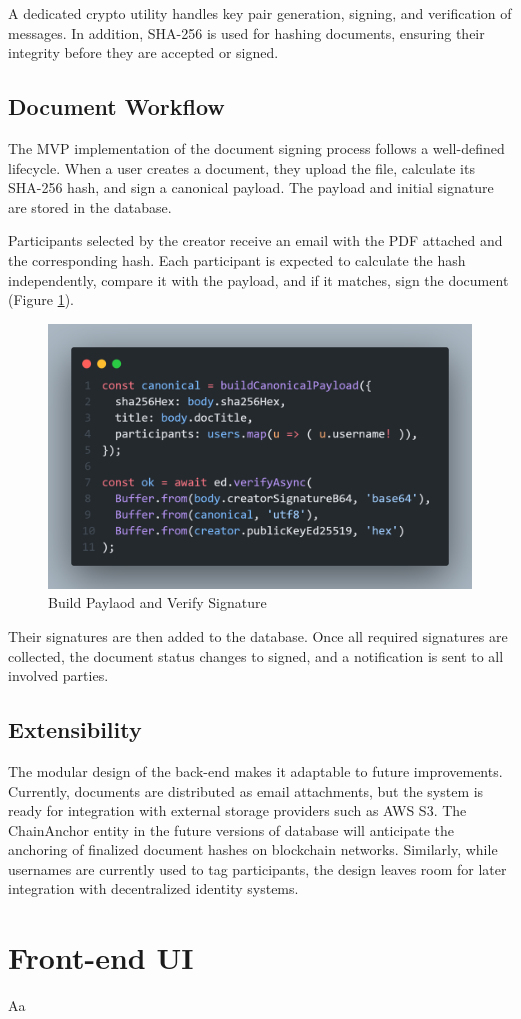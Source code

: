 A dedicated crypto utility handles key pair generation, signing, and verification of messages. In addition, SHA-256 is used for hashing documents, ensuring their integrity before they are accepted or signed.

\subsection{Document Workflow}
The MVP implementation of the document signing process follows a well-defined lifecycle. When a user creates a document, they upload the file, calculate its SHA-256 hash, and sign a canonical payload. The payload and initial signature are stored in the database.

Participants selected by the creator receive an email with the PDF attached and the corresponding hash. Each participant is expected to calculate the hash independently, compare it with the payload, and if it matches, sign the document (Figure \ref{payload-signature}). 

\begin{figure}[H]
    \centering
    \includegraphics[width=18cm]{"images/payload-signature.png"}
    \caption{Build Paylaod and Verify Signature}
    \label{payload-signature}
\end{figure}

Their signatures are then added to the database. Once all required signatures are collected, the document status changes to signed, and a notification is sent to all involved parties.

\subsection{Extensibility}
The modular design of the back-end makes it adaptable to future improvements. Currently, documents are distributed as email attachments, but the system is ready for integration with external storage providers such as AWS S3. The ChainAnchor entity in the future versions of database will anticipate the anchoring of finalized document hashes on blockchain networks. Similarly, while usernames are currently used to tag participants, the design leaves room for later integration with decentralized identity systems.

\section{Front-end UI}
Aa
